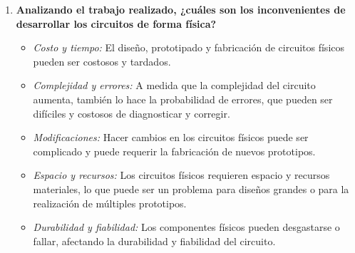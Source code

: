 \documentclass{article}
\begin{document}
\begin{enumerate}
    \item \textbf{Analizando el trabajo realizado, ¿cuáles son los inconvenientes de desarrollar los circuitos de forma física?}
    \begin{itemize}
        \item \textit{Costo y tiempo:} El diseño, prototipado y fabricación de circuitos físicos pueden ser costosos y tardados.
        \item \textit{Complejidad y errores:} A medida que la complejidad del circuito aumenta, también lo hace la probabilidad de errores, que pueden ser difíciles y costosos de diagnosticar y corregir.
        \item \textit{Modificaciones:} Hacer cambios en los circuitos físicos puede ser complicado y puede requerir la fabricación de nuevos prototipos.
        \item \textit{Espacio y recursos:} Los circuitos físicos requieren espacio y recursos materiales, lo que puede ser un problema para diseños grandes o para la realización de múltiples prototipos.
        \item \textit{Durabilidad y fiabilidad:} Los componentes físicos pueden desgastarse o fallar, afectando la durabilidad y fiabilidad del circuito.
    \end{itemize}
\end{enumerate}
\end{document}
